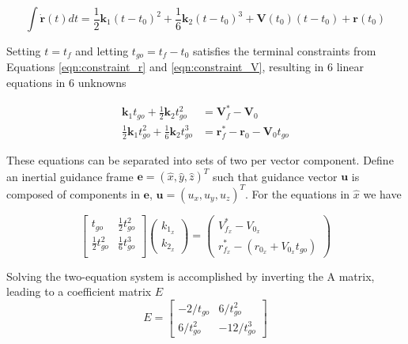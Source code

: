 \begin{equation}
\int \boldsymbol{\dot{r}}(t)dt = \frac{1}{2} \boldsymbol{k}_1(t-t_0)^2 + \frac{1}{6}\boldsymbol{k}_2(t-t_0)^3 + \boldsymbol{V}(t_0)(t-t_0) + \boldsymbol{r}(t_0) 
\label{eqn:EoM_solve_2}
\end{equation}

Setting $t = t_f$ and letting $t_{go} = t_f - t_0$ satisfies the terminal constraints from Equations \ref{eqn:constraint_r} and \ref{eqn:constraint_V}, resulting in 6 linear equations in 6 unknowns

\begin{align}
\label{eqn:system1}
\boldsymbol{k}_1 t_{go} + \frac{1}{2}\boldsymbol{k}_2 t_{go}^2 &= \boldsymbol{V}_f^* - \boldsymbol{V}_0\\
\label{eqn:system2}
\frac{1}{2}\boldsymbol{k}_1 t_{go}^2 + \frac{1}{6}\boldsymbol{k}_2 t_{go}^3 &= \boldsymbol{r}_f^* - \boldsymbol{r}_0 - \boldsymbol{V}_0t_{go}
\end{align}

These equations can be separated into sets of two per vector component. Define an inertial guidance frame $\boldsymbol{e} = (\hat{x},\hat{y},\hat{z})^T$ such that guidance vector $\boldsymbol{u}$ is composed of components in $\boldsymbol{e}$, $\boldsymbol{u} = (u_{x},u_{y},u_{z})^T$. For the equations in $\hat{x}$ we have

\begin{equation}
  \begin{bmatrix}
    t_{go} & \frac{1}{2}t_{go}^2 \\
    \frac{1}{2}t_{go}^2 & \frac{1}{6}t_{go}^3 \\
  \end{bmatrix}
 \left(
	\begin{matrix}
	k_{1_x} \\ 
	k_{2_x} 
	\end{matrix}
\right) = 
 \left(
	\begin{matrix}
	V_{f_x}^* - V_{0_x} \\ 
	r_{f_x}^* - (r_{0_x} + V_{0_x}t_{go}) 
	\end{matrix}
\right)
\end{equation}

Solving the two-equation system is accomplished by inverting the A matrix, leading to a coefficient matrix $E$
\begin{equation}
E = 
	\begin{bmatrix}
	-2/t_{go} & 6/t_{go}^2 \\
	6/t_{go}^2 & -12/t_{go}^3
	\end{bmatrix}
\end{equation}

